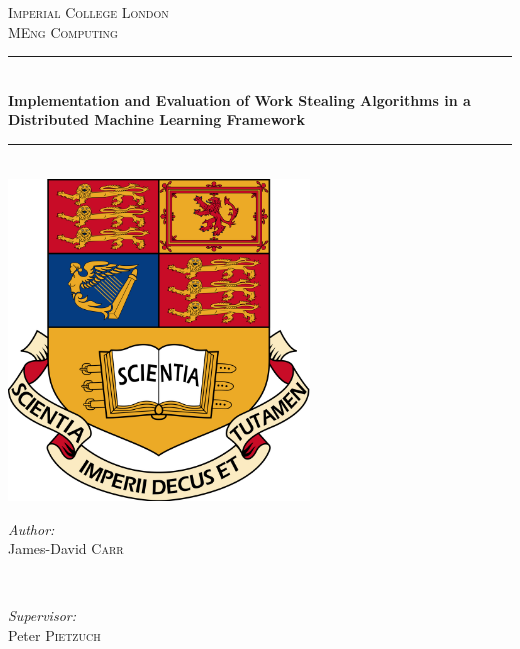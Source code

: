 \documentclass[12pt]{article}
\title{}
\author{James-David Carr}
\date{\today}
\begin{document}
\begin{titlepage}

\newcommand{\HRule}{\rule{\linewidth}{0.5mm}} %

\center %
 

\textsc{\LARGE Imperial College London}\\[1.5cm] %
\textsc{\Large MEng Computing}\\[0.5cm] %


\HRule \\[0.4cm]
{ \huge \bfseries Implementation and Evaluation of Work Stealing Algorithms in a Distributed Machine Learning Framework}\\[0.4cm] %
\HRule \\[1.5cm]

\includegraphics[width=0.6\textwidth]{imperialCollegeCrest}
 

\begin{minipage}{0.4\textwidth}
\begin{flushleft} \large
\emph{Author:}\\
James-David \textsc{Carr} %
\end{flushleft}
\end{minipage}
~
\begin{minipage}{0.4\textwidth}
\begin{flushright} \large
\emph{Supervisor:} \\
Peter \textsc{Pietzuch} %
\end{flushright}
\end{minipage}\\[4cm]


\end{titlepage}
\end{document}
